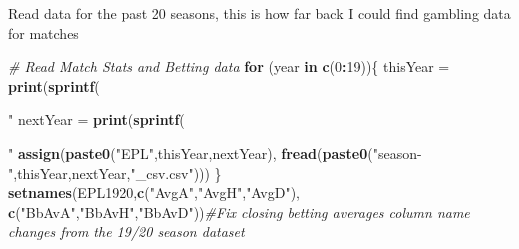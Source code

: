 \documentclass[
]{article}
\newenvironment{Shaded}{\begin{snugshade}}{\end{snugshade}}
\newcommand{\CommentTok}[1]{\textcolor[rgb]{0.56,0.35,0.01}{\textit{#1}}}
\newcommand{\ControlFlowTok}[1]{\textcolor[rgb]{0.13,0.29,0.53}{\textbf{#1}}}
\newcommand{\DecValTok}[1]{\textcolor[rgb]{0.00,0.00,0.81}{#1}}
\newcommand{\KeywordTok}[1]{\textcolor[rgb]{0.13,0.29,0.53}{\textbf{#1}}}
\newcommand{\NormalTok}[1]{#1}
\newcommand{\OperatorTok}[1]{\textcolor[rgb]{0.81,0.36,0.00}{\textbf{#1}}}
\newcommand{\StringTok}[1]{\textcolor[rgb]{0.31,0.60,0.02}{#1}}
\begin{document}
Read data for the past 20 seasons, this is how far back I could find
gambling data for matches

\begin{Shaded}
\begin{Highlighting}[]
\CommentTok{# Read Match Stats and Betting data}
\ControlFlowTok{for}\NormalTok{ (year }\ControlFlowTok{in} \KeywordTok{c}\NormalTok{(}\DecValTok{0}\OperatorTok{:}\DecValTok{19}\NormalTok{))\{}
\NormalTok{  thisYear =}\StringTok{ }\KeywordTok{print}\NormalTok{(}\KeywordTok{sprintf}\NormalTok{(}\StringTok{"%
\NormalTok{  nextYear =}\StringTok{ }\KeywordTok{print}\NormalTok{(}\KeywordTok{sprintf}\NormalTok{(}\StringTok{"%
  \KeywordTok{assign}\NormalTok{(}\KeywordTok{paste0}\NormalTok{(}\StringTok{"EPL"}\NormalTok{,thisYear,nextYear), }\KeywordTok{fread}\NormalTok{(}\KeywordTok{paste0}\NormalTok{(}\StringTok{"season-"}\NormalTok{,thisYear,nextYear,}\StringTok{"_csv.csv"}\NormalTok{)))}
\NormalTok{\}}
\KeywordTok{setnames}\NormalTok{(EPL1920,}\KeywordTok{c}\NormalTok{(}\StringTok{"AvgA"}\NormalTok{,}\StringTok{"AvgH"}\NormalTok{,}\StringTok{"AvgD"}\NormalTok{), }\KeywordTok{c}\NormalTok{(}\StringTok{"BbAvA"}\NormalTok{,}\StringTok{"BbAvH"}\NormalTok{,}\StringTok{"BbAvD"}\NormalTok{))}\CommentTok{#Fix closing betting averages column name changes from the 19/20 season dataset}

}}
\end{Highlighting}
\end{Shaded}
\end{document}
